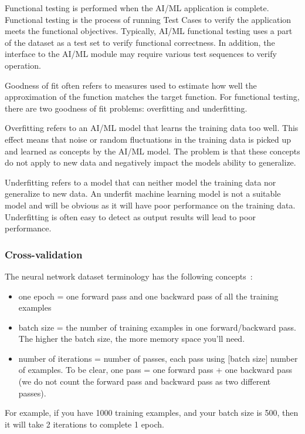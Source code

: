 Functional testing is performed when the AI/ML application is complete.  Functional
testing is the process of running Test Cases to verify
the application meets the functional objectives. Typically, AI/ML functional testing uses  a part of the dataset as a test set to verify functional correctness. In addition, the interface to the AI/ML module may require various test sequences to verify operation.

Goodness of fit often refers to measures used to estimate how well the approximation of the function matches the target function. For functional testing, there are two goodness of fit problems:  overfitting and underfitting. 

Overfitting refers to an AI/ML model that learns the training data too well. This effect means that noise or random fluctuations in the training data is picked up and learned as concepts by the AI/ML model. The problem is that these concepts do not apply to new data and negatively impact the models ability to generalize.


Underfitting refers to a model that can neither model the training data nor generalize to new data. An underfit machine learning model is not a suitable model and will be obvious as it will have poor performance on the training data.  Underfitting is often easy to detect as output results will lead to poor performance. 

\subsubsection{Cross-validation}

The neural network dataset terminology has the following concepts~\cite{batchsizeNN}:
\begin{itemize}
\item	one epoch = one forward pass and one backward pass of all the training examples
\item	batch size = the number of training examples in one forward/backward pass. The higher the batch size, the more memory space you'll need.
\item	number of iterations = number of passes, each pass using [batch size] number of examples. To be clear, one pass = one forward pass + one backward pass (we do not count the forward pass and backward pass as two different passes).
\end{itemize}

For example, if you have 1000 training examples, and your batch size is 500, then it will take 2 iterations to complete 1 epoch.



